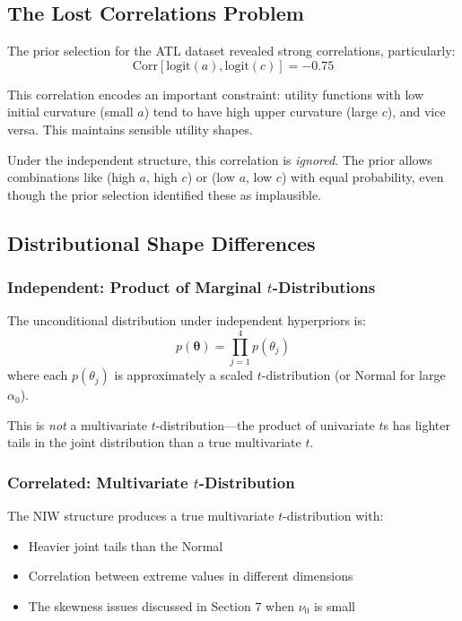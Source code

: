 \documentclass[11pt]{article}
\begin{document}
\subsection{The Lost Correlations Problem}

The prior selection for the ATL dataset revealed strong correlations, particularly:
\[
  \text{Corr}[\text{logit}(a), \text{logit}(c)] = -0.75
\]

This correlation encodes an important constraint: utility functions with low initial curvature (small $a$) tend to have high upper curvature (large $c$), and vice versa. This maintains sensible utility shapes.

Under the independent structure, this correlation is \textit{ignored}. The prior allows combinations like (high $a$, high $c$) or (low $a$, low $c$) with equal probability, even though the prior selection identified these as implausible.

\subsection{Distributional Shape Differences}

\subsubsection{Independent: Product of Marginal $t$-Distributions}

The unconditional distribution under independent hyperpriors is:
\[
  p(\boldsymbol{\theta}) = \prod_{j=1}^{4} p(\theta_j)
\]
where each $p(\theta_j)$ is approximately a scaled $t$-distribution (or Normal for large $\alpha_0$).

This is \textit{not} a multivariate $t$-distribution---the product of univariate $t$s has lighter tails in the joint distribution than a true multivariate $t$.

\subsubsection{Correlated: Multivariate $t$-Distribution}

The NIW structure produces a true multivariate $t$-distribution with:
\begin{itemize}
  \item Heavier joint tails than the Normal
  \item Correlation between extreme values in different dimensions
  \item The skewness issues discussed in Section 7 when $\nu_0$ is small
\end{itemize}
\end{document}
